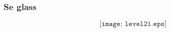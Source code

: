 \documentclass[aspectratio=169,xcolor=dvipsnames]{beamer}
\begin{document}
%
%
%
%
%
%
%
%
%
%
%
%
%
%
\begin{frame}
	\frametitle{Se glass}

$$\texttt{[image: level21.eps]}$$
\end{frame}
%
\end{document}
